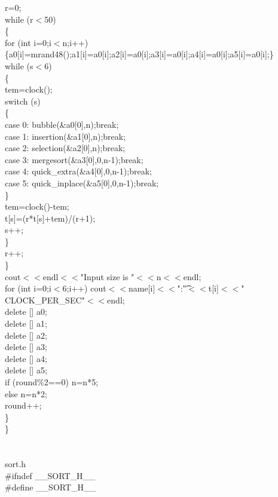\documentclass{article}
\begin{document}
    r=0;\\
    while (r$<$50)\\
    \{\\
	  for (int i=0;i$<$n;i++) \{a0[i]=mrand48();a1[i]=a0[i];a2[i]=a0[i];a3[i]=a0[i];a4[i]=a0[i];a5[i]=a0[i];\}\\
	  while (s$<$6)\\
	  \{\\
	      tem=clock();\\
	      switch (s)\\
	      \{\\
		  case 0: bubble(\&a0[0],n);break;\\
		  case 1: insertion(\&a1[0],n);break;\\
		  case 2: selection(\&a2[0],n);break;\\
		  case 3: mergesort(\&a3[0],0,n-1);break;\\
		  case 4: quick\_extra(\&a4[0],0,n-1);break;\\
		  case 5: quick\_inplace(\&a5[0],0,n-1);break;\\
	      \}\\
	      tem=clock()-tem;\\
	      t[s]=(r*t[s]+tem)/(r+1);\\
              s++;\\
	  \}\\
	  r++;\\
    \}\\
    cout$<<$endl$<<$"Input size is "$<<$n$<<$endl;\\
    for (int i=0;i$<$6;i++) cout$<<$name[i]$<<$":\t"$<<$t[i]$<<$" CLOCK\_PER\_SEC"$<<$endl;\\
    delete [] a0;\\
    delete [] a1;\\
    delete [] a2;\\
    delete [] a3;\\
    delete [] a4;\\
    delete [] a5;\\
    if (round\%2==0) n=n*5;\\
    else n=n*2;\\
    round++;\\
    \}\\
\}\\
\\
\\sort.h\\
\#ifndef \_\_SORT\_H\_\_\\
\#define \_\_SORT\_H\_\_\\
\end{document}
